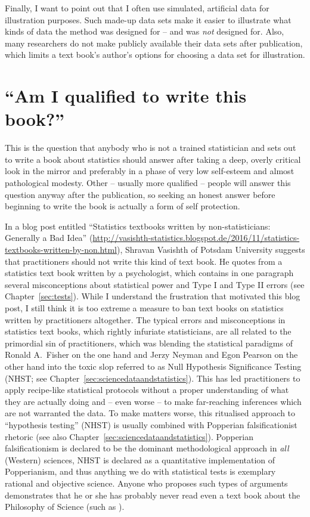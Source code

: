 Finally, I want to point out that I often use simulated, artificial data for illustration purposes.
Such made-up data sets make it easier to illustrate what kinds of data the method was designed for -- and was \textit{not} designed for.
Also, many researchers do not make publicly available their data sets after publication, which limits a text book's author's options for choosing a data set for illustration.


\section*{``Am I qualified to write this book?''}

This is the question that anybody who is not a trained statistician and sets out to write a book about statistics should answer after taking a deep, overly critical look in the mirror and preferably in a phase of very low self-esteem and almost pathological modesty.
Other -- usually more qualified -- people will answer this question anyway after the publication, so seeking an honest answer before beginning to write the book is actually a form of self protection.

In a blog post entitled ``Statistics textbooks written by non-statisticians: Generally a Bad Idea'' (\url{http://vasishth-statistics.blogspot.de/2016/11/statistics-textbooks-written-by-non.html}), Shravan Vasishth of Potsdam University suggests that practitioners should not write this kind of text book. 
He quotes from a statistics text book written by a psychologist, which contains in one paragraph several misconceptions about statistical power and Type I and Type II errors (see Chapter~\ref{sec:tests}).
While I understand the frustration that motivated this blog post, I still think it is too extreme a measure to ban text books on statistics written by practitioners altogether.
The typical errors and misconceptions in statistics text books, which rightly infuriate statisticians, are all related to the primordial sin of practitioners, which was blending the statistical paradigms of Ronald A.\ Fisher on the one hand and Jerzy Neyman and Egon Pearson on the other hand into the toxic slop referred to as Null Hypothesis Significance Testing (NHST; see Chapter~\ref{sec:sciencedataandstatistics}).
This has led practitioners to apply recipe-like statistical protocols without a proper understanding of what they are actually 
doing and -- even worse -- to make far-reaching inferences which are not warranted the data.
To make matters worse, this ritualised approach to ``hypothesis testing'' (NHST) is usually combined with Popperian falsificationist rhetoric (see also Chapter~\ref{sec:sciencedataandstatistics}).
Popperian falsificationism is declared to be the dominant methodological approach in \textit{all} (Western) sciences, NHST is declared as a quantitative implementation of Popperianism, and thus anything we do with statistical tests is exemplary rational and objective science.
Anyone who proposes such types of arguments demonstrates that he or she has probably never read even a text book about the Philosophy of Science (such as \citealt{Chalmers2013}).

